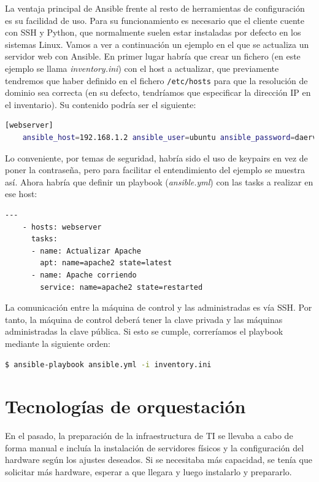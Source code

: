 	La ventaja principal de Ansible frente al resto de herramientas de configuración es su facilidad de uso. Para su funcionamiento es necesario que el cliente cuente con SSH y Python, que normalmente suelen estar instaladas por defecto en los sistemas Linux. Vamos a ver a continuación un ejemplo en el que se actualiza un servidor web con Ansible. En primer lugar habría que crear un fichero (en este ejemplo se llama \textit{inventory.ini}) con el host a actualizar, que previamente tendremos que haber definido en el fichero \texttt{/etc/hosts} para que la resolución de dominio sea correcta (en su defecto, tendríamos que especificar la dirección IP en el inventario). Su contenido podría ser el siguiente:
	
\clearpage
\begin{lstlisting}[language=Bash, caption=Contenido del fichero inventory.ini]
	[webserver]
	ansible_host=192.168.1.2 ansible_user=ubuntu ansible_password=daerv
\end{lstlisting}	
	
	Lo conveniente, por temas de seguridad, habría sido el uso de keypairs en vez de poner la contraseña, pero para facilitar el entendimiento del ejemplo se muestra así. Ahora habría que definir un playbook (\textit{ansible.yml}) con las tasks a realizar en ese host:

\vspace{0.2cm}
\begin{lstlisting}[language=Bash, caption=Contenido del fichero ansible.yml]
	---
	- hosts: webserver
	  tasks:
	  - name: Actualizar Apache 
	    apt: name=apache2 state=latest
	  - name: Apache corriendo  
	    service: name=apache2 state=restarted
\end{lstlisting}

	La comunicación entre la máquina de control y las administradas es vía SSH. Por tanto, la máquina de control deberá tener la clave privada y las máquinas administradas la clave pública. Si esto se cumple, correríamos el playbook mediante la siguiente orden:

\vspace{0.2cm}
\begin{lstlisting}[language=Bash]
        		$ ansible-playbook ansible.yml -i inventory.ini 
\end{lstlisting}
\clearpage

\section{Tecnologías de orquestación} \label{sec:orq}
En el pasado, la preparación de la infraestructura de TI se llevaba a cabo de forma manual e incluía la instalación de servidores físicos y la configuración del hardware según los ajustes deseados. Si se necesitaba más capacidad, se tenía que solicitar más hardware, esperar a que llegara y luego instalarlo y prepararlo.~\cite{orq1} 

